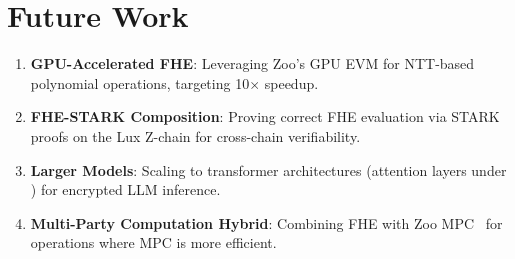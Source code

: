 \section{Future Work}


\begin{enumerate}
    \item \textbf{GPU-Accelerated FHE}: Leveraging Zoo's GPU EVM for NTT-based polynomial operations, targeting 10$\times$ speedup.
    \item \textbf{FHE-STARK Composition}: Proving correct FHE evaluation via STARK proofs on the Lux Z-chain for cross-chain verifiability.
    \item \textbf{Larger Models}: Scaling to transformer architectures (attention layers under \CKKS{}) for encrypted LLM inference.
    \item \textbf{Multi-Party Computation Hybrid}: Combining FHE with Zoo MPC~\cite{lux-mchain-mpc} for operations where MPC is more efficient.
\end{enumerate}

